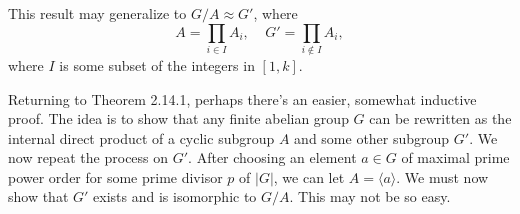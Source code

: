 \documentclass[12pt]{article}
\begin{document}
This result may generalize to $G/A\approx G'$, where
\begin{equation*}
A=\prod_{i\in I} A_i,\;\;\;\;G' = \prod_{i\not\in I} A_i,
\end{equation*}
where $I$ is some subset of the integers in $[1,k]$.

Returning to Theorem 2.14.1, perhaps there's an easier, somewhat inductive proof.
The idea is to show that any finite abelian group $G$ can be rewritten as the internal direct
product of a cyclic subgroup $A$ and some other subgroup $G'$.  We now repeat the process on $G'$.
After choosing an element $a\in G$ of maximal prime power order for some prime divisor $p$ of $|G|$,
we can let $A=\langle a\rangle$.  We must now show that $G'$ exists and is isomorphic to $G/A$.
This may not be so easy.
\end{document}

